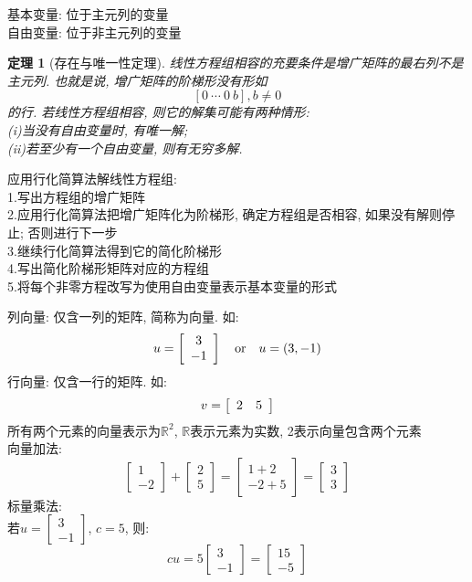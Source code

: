 \documentclass[UTF8,fontset=ubuntu]{ctexart}
\theoremstyle{nonumberplain}
\theoremstyle{break}
\newtheorem{theorem}{定理}
\theoremstyle{empty}
\begin{document}
基本变量: 位于主元列的变量\\
自由变量: 位于非主元列的变量\\
\begin{theorem}[存在与唯一性定理]
线性方程组相容的充要条件是增广矩阵的最右列不是主元列. 也就是说, 增广矩阵的阶梯形没有形如
	\[[0\ \cdots\ 0\ b], b\neq 0\]
的行. 若线性方程组相容, 则它的解集可能有两种情形:\\
(i)当没有自由变量时, 有唯一解;\\
(ii)若至少有一个自由变量, 则有无穷多解.\\[1ex]
\end{theorem}
应用行化简算法解线性方程组:\\
1.写出方程组的增广矩阵\\
2.应用行化简算法把增广矩阵化为阶梯形, 确定方程组是否相容, 如果没有解则停止; 否则进行下一步\\
3.继续行化简算法得到它的简化阶梯形\\
4.写出简化阶梯形矩阵对应的方程组\\
5.将每个非零方程改写为使用自由变量表示基本变量的形式

列向量: 仅含一列的矩阵, 简称为向量. 如:
\[u=\left[\begin{array}{c}
	3\\
	-1
\end{array}\right] \text{\quad or\quad} u=(3, -1)\]
行向量: 仅含一行的矩阵. 如:
\[v=\left[\begin{array}{c c}
	2 & 5
\end{array}\right]\]
所有两个元素的向量表示为$\mathbb{R}^2$, $\mathbb{R}$表示元素为实数, 2表示向量包含两个元素\\
向量加法:
\begin{equation*}
\left[\begin{array}{c}
	1\\
	-2
\end{array}\right]
+
\left[\begin{array}{c}
	2\\
	5
\end{array}\right]
=
\left[\begin{array}{c}
	1+2\\
	-2+5
\end{array}\right]
=
\left[\begin{array}{c}
	3\\
	3
\end{array}\right]
\end{equation*}
标量乘法:\\
\indent 若$u=\left[\begin{array}{c}3\\-1\end{array}\right]$, $c=5$, 则:
\[cu=5\left[\begin{array}{c}3\\-1\end{array}\right]=\left[\begin{array}{c}15\\-5\end{array}\right]\]
\end{document}
